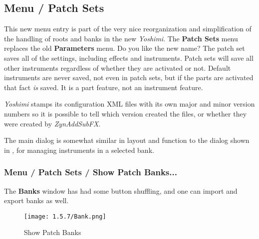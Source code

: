 %
%
%

\subsection{Menu / Patch Sets}
\label{subsubsec:menu_patch_sets}

   This new menu entry is part of the very nice reorganization and simplification
   of the handling of roots and banks in the new \textsl{Yoshimi}.  The
   \textbf{Patch Sets} menu replaces the old \textbf{Parameters} menu.  Do you
   like the new name?  The patch set saves all of the settings, including effects
   and instruments.  Patch sets will save all other instruments regardless of
   whether they are activated or not.  Default instruments are never saved, not
   even in patch sets, but if the parts are activated that fact \textsl{is}
   saved.  It is a part feature, not an instrument feature.

   \textsl{Yoshimi} stamps its configuration XML files with its own major and
   minor version numbers so it is possible to tell which version created the
   files, or whether they were created by \textsl{ZynAddSubFX}.

   The main dialog is somewhat similar in layout and function to the
   dialog shown in
   ,
   for managing instruments in a selected bank.

\subsubsection{Menu / Patch Sets / Show Patch Banks...}
\label{subsubsec:menu_patch_sets_show_patch_banks}

   The \textbf{Banks} window has had some button shuffling, and one can
   import and export banks as well.

\begin{figure}[H]
   \centering
   \texttt{[image: 1.5.7/Bank.png]}
   \caption[Show Patch Banks]{Show Patch Banks}
   \label{fig:show_patch_banks}
\end{figure}

